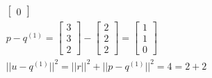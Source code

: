 \documentclass[12pt]{article}
\begin{document}
\begin{flushleft}
\begin{align}
\begin{bmatrix}
                                                          0
                                                      \end{bmatrix}  \\
        p - q^{(1)} = \begin{bmatrix}
                          3 \\
                          3 \\
                          2
                      \end{bmatrix} -  \begin{bmatrix}
                                           2 \\
                                           2 \\
                                           2
                                       \end{bmatrix} = \begin{bmatrix}
                                                           1 \\
                                                           1 \\
                                                           0
                                                       \end{bmatrix} \\
        ||u - q^{(1)}||^{2} = ||r||^{2}  +  ||p - q^{(1)}||^{2}
        = 4  =  2 + 2
    \end{align}


\end{flushleft}
\end{document}
